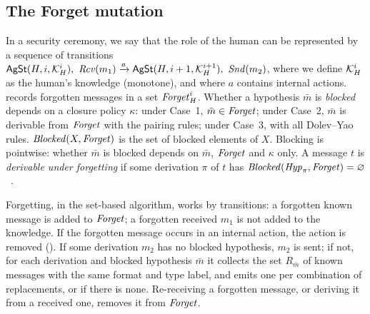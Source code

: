 \subsection{The Forget mutation}\label{subsec:forget}
In a security ceremony, we say that the role of the human can be represented by a sequence of transitions $\AgSt(\human,i,\K{\human}{i}),\ \mathit{Rcv}(m_1) \xrightarrow{a} \AgSt(\human,i+1,\K{\human}{i+1}),\ \mathit{Snd}(m_2)$, where we define $\mathcal{K}_{H}^{i}$ as the human's knowledge (monotone), and where $a$ contains internal actions. \forget{} records forgotten messages in a set $\mathit{Forget}^i_{H}$. Whether a hypothesis $\bar m$ is \emph{blocked} depends on a closure policy $\kappa$: under Case~1, $\bar m\in\mathit{Forget}$; under Case~2, $\bar m$ is derivable from $\mathit{Forget}$ with the pairing rules; under Case~3, with all Dolev--Yao rules. $\mathit{Blocked}(X,\mathit{Forget})$ is the set of blocked elements of $X$. Blocking is pointwise: whether $\bar m$ is blocked depends on $\bar m$, $\mathit{Forget}$ and $\kappa$ only. A message $t$ is \emph{derivable under forgetting} if some derivation $\pi$ of $t$ has $\mathit{Blocked}(\mathit{Hyp}_\pi,\mathit{Forget})=\varnothing$~\cite[Def.~4]{sandu2026formal}.

Forgetting, in the set-based algorithm, works by transitions: a forgotten known message is added to $\mathit{Forget}$; a forgotten received $m_1$ is not added to the knowledge. If the forgotten message occurs in an internal action, the action is removed (\neglect). If some derivation $m_2$ has no blocked hypothesis, $m_2$ is sent; if not, for each derivation and blocked hypothesis $\bar m$ it collects the set $R_{\bar m}$ of known messages with the same format and type label, and emits one \replace{} per combination of replacements, or \skipm{} if there is none. Re-receiving a forgotten message, or deriving it from a received one, removes it from $\mathit{Forget}$.

